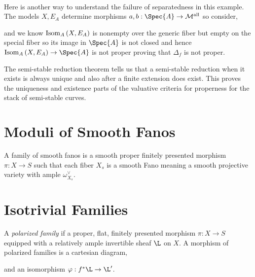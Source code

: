 \documentclass[12pt]{article}
\begin{document}
\begin{example}
\bigskip\\
Here is another way to understand the failure of separatedness in this example. The models $X, E_A$ determine morphisms $a,b : \Spec{A} \to \Mall$ so consider,
\begin{center}
\end{center}
and we know $\Isom[A]{X}{E_A}$ is nonempty over the generic fiber but empty on the special fiber so its image in $\Spec{A}$ is not closed and hence $\Isom[A]{X}{E_A} \to \Spec{A}$ is not proper proving that $\Delta_f$ is not proper.
\end{example}

\begin{rmk}
The semi-stable reduction theorem tells us that a semi-stable reduction when it exists is always unique and also after a finite extension does exist. This proves the uniqueness and existence parts of the valuative criteria for properness for the stack of semi-stable curves. 
\end{rmk}

\section{Moduli of Smooth Fanos}

\begin{defn}
A family of smooth fanos is a smooth proper finitely presented morphism $\pi : X \to S$ such that each fiber $X_s$ is a smooth Fano meaning a smooth projective variety with ample $\omega_{X_s}^\vee$.  
\end{defn}

\section{Isotrivial Families}

\begin{defn}
A \textit{polarized family} if a proper, flat, finitely presented morphism $\pi : X \to S$ equipped with a relatively ample invertible sheaf $\L$ on $X$. A morphism of polarized families is a cartesian diagram,
\begin{center}
\end{center}
and an isomorphism $\varphi : f^* \L \to \L'$. 
\end{defn}
\end{document}
